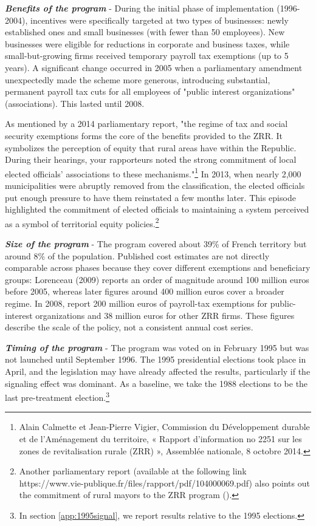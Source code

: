 \textit{\textbf{Benefits of the program}} - During the initial phase of implementation (1996-2004), incentives were specifically targeted at two types of businesses: newly established ones and small businesses (with fewer than 50 employees). New businesses were eligible for reductions in corporate and business taxes, while small-but-growing firms received temporary payroll tax exemptions (up to 5 years). A significant change occurred in 2005 when a parliamentary amendment unexpectedly made the scheme more generous, introducing substantial, permanent payroll tax cuts for all employees of "public interest organizations" (associations). This lasted until 2008.

As mentioned by a 2014 parliamentary report, "the regime of tax and social security exemptions forms the core of the benefits provided to the ZRR. It symbolizes the perception of equity that rural areas have within the Republic. During their hearings, your rapporteurs noted the strong commitment of local elected officials' associations to these mechanisms."\footnote{Alain Calmette et Jean-Pierre Vigier, Commission du Développement durable et de l'Aménagement du territoire, « Rapport d'information no 2251 sur les zones de revitalisation rurale (ZRR) », Assemblée nationale, 8 octobre 2014.} In 2013, when nearly 2,000 municipalities were abruptly removed from the classification, the elected officials put enough pressure to have them reinstated a few months later. This episode highlighted the commitment of elected officials to maintaining a system perceived as a symbol of territorial equity policies.\footnote{Another parliamentary report (available at the following link https://www.vie-publique.fr/files/rapport/pdf/104000069.pdf)
 also points out the commitment of rural mayors to the ZRR program (\cite{zrr_evaluation}). }

\textit{\textbf{Size of the program}} - The program covered about 39\% of French territory but around 8\% of the population. Published cost estimates are not directly comparable across phases because they cover different exemptions and beneficiary groups: Lorenceau (2009) reports an order of magnitude around 100 million euros before 2005, whereas later figures around 400 million euros cover a broader regime. In 2008, \cite{BEHAGHEL20151} report 200 million euros of payroll-tax exemptions for public-interest organizations and 38 million euros for other ZRR firms. These figures describe the scale of the policy, not a consistent annual cost series.

\textbf{\textit{Timing of the program}} - The program was voted on in February 1995 but was not launched until September 1996. The 1995 presidential elections took place in April, and the legislation may have already affected the results, particularly if the signaling effect was dominant. As a baseline, we take the 1988 elections to be the last pre-treatment election.\footnote{In section \ref{app:1995signal}, we report results relative to the 1995 elections.}


